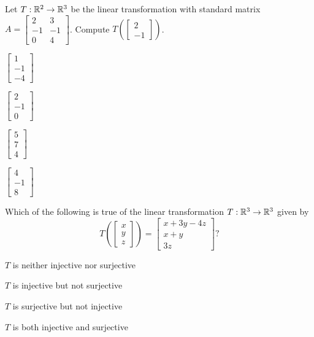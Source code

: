 \documentclass{article}
\begin{document}
\begin{readinessAssuranceTest}
\newpage
\item Let $T: \mathbb{R}^2 \rightarrow \mathbb{R}^3$ be the linear transformation with standard matrix $A=\begin{bmatrix} 2 & 3 \\ -1 & -1 \\ 0 & 4 \end{bmatrix}$.  Compute $T\left(\begin{bmatrix} 2 \\ -1 \end{bmatrix}\right)$.
\begin{multicols}{4}
\begin{readinessAssuranceTestChoices}
\item $\begin{bmatrix} 1 \\ -1 \\ -4 \end{bmatrix}$ %
\item $\begin{bmatrix} 2 \\ -1 \\ 0 \end{bmatrix}$
\item $\begin{bmatrix} 5 \\ 7 \\ 4\end{bmatrix}$
\item $\begin{bmatrix} 4 \\ -1 \\ 8 \end{bmatrix}$
\end{readinessAssuranceTestChoices}
\end{multicols}


\item Which of the following is true of the linear transformation $T: \mathbb{R}^3 \rightarrow \mathbb{R}^3$ given by $$T\left(\begin{bmatrix} x \\ y \\ z \end{bmatrix} \right) = \begin{bmatrix} x+3y-4z \\ x+y \\ 3z \end{bmatrix}?$$
\begin{readinessAssuranceTestChoices}
\item $T$ is neither injective nor surjective
\item $T$ is injective but not surjective
\item $T$ is surjective but not injective
\item $T$ is both injective and surjective %
\end{readinessAssuranceTestChoices}



\end{readinessAssuranceTest}
\end{document}
